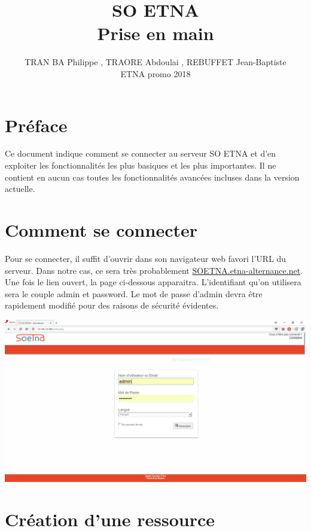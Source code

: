 \documentclass[a4paper,11pt]{article}
\title{SO ETNA \\ Prise en main}
\author{TRAN BA Philippe , TRAORE Abdoulai , REBUFFET Jean-Baptiste \\ ETNA promo 2018}
\begin{document}
\pagestyle{fancy}
\date{}
\chead{}
\rhead{}
\cfoot{}
\renewcommand{\headrulewidth}{0.4pt}
\renewcommand{\footrulewidth}{0.4pt}

\maketitle
\tableofcontents

\section*{Préface}
Ce document indique comment se connecter au serveur SO ETNA et d'en exploiter les fonctionnalités les plus basiques
et les plus importantes. Il ne contient en aucun cas toutes les fonctionnalités avancées incluses dans la version actuelle.

\newpage

\section{Comment se connecter}

Pour se connecter, il suffit d'ouvrir dans son navigateur web favori l'URL du serveur. Dans notre cas, ce sera très probablement
\url{SOETNA.etna-alternance.net}. Une fois le lien ouvert, la page ci-dessous apparaitra. L'identifiant qu'on utilisera
sera le couple admin et password. Le mot de passe d'admin devra être rapidement modifié pour des raisons de sécurité évidentes.

\includegraphics[width=15cm]{./login.PNG}

\section{Création d'une ressource}
\end{document}
